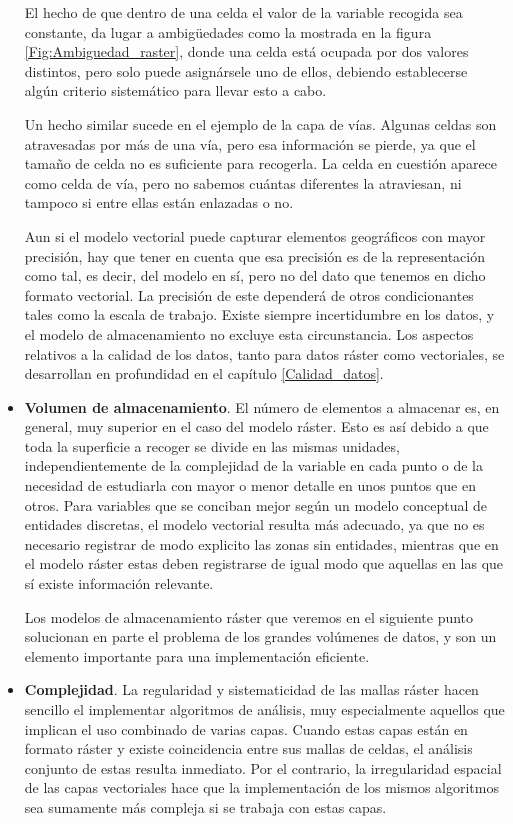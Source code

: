 \begin{multicols}{2}
\begin{itemize}
El hecho de que dentro de una celda el valor de la variable recogida sea constante, da lugar a ambigüedades como la mostrada en la figura \ref{Fig:Ambiguedad_raster}, donde una celda está ocupada por dos valores distintos, pero solo puede asignársele uno de ellos, debiendo establecerse algún criterio sistemático para llevar esto a cabo.

Un hecho similar sucede en el ejemplo de la capa de vías. Algunas celdas son atravesadas por más de una vía, pero esa información se pierde, ya que el tamaño de celda no es suficiente para recogerla. La celda en cuestión aparece como celda de vía, pero no sabemos cuántas diferentes la atraviesan, ni tampoco si entre ellas están enlazadas o no.

Aun si el modelo vectorial puede capturar elementos geográficos con mayor precisión, hay que tener en cuenta que esa precisión es de la representación como tal, es decir, del modelo en sí, pero no del dato que tenemos en dicho formato vectorial. La precisión de este dependerá de otros condicionantes tales como la escala de trabajo. Existe siempre incertidumbre en los datos, y el modelo de almacenamiento no excluye esta circunstancia. Los aspectos relativos a la calidad de los datos, tanto para datos ráster como vectoriales, se desarrollan en profundidad en el capítulo \ref{Calidad_datos}.

\item \textbf{Volumen de almacenamiento}. El número de elementos a almacenar es, en general, muy superior en el caso del modelo ráster. Esto es así debido a que toda la superficie a recoger se divide en las mismas unidades, independientemente de la complejidad de la variable en cada punto o de la necesidad de estudiarla con mayor o menor detalle en unos puntos que en otros. Para variables que se conciban mejor según un modelo conceptual de entidades discretas, el modelo vectorial resulta más adecuado, ya que no es necesario registrar de modo explicito las zonas sin entidades, mientras que en el modelo ráster estas deben registrarse de igual modo que aquellas en las que sí existe información relevante.

Los modelos de almacenamiento ráster que veremos en el siguiente punto solucionan en parte el problema de los grandes volúmenes de datos, y son un elemento importante para una implementación eficiente.

\item \textbf{Complejidad}. La regularidad y sistematicidad de las mallas ráster hacen sencillo el implementar algoritmos de análisis, muy especialmente aquellos que implican el uso combinado de varias capas. Cuando estas capas están en formato ráster y existe coincidencia entre sus mallas de celdas, el análisis conjunto de estas resulta inmediato. Por el contrario, la irregularidad espacial de las capas vectoriales hace que la implementación de los mismos algoritmos sea sumamente más compleja si se trabaja con estas capas.


\end{itemize}
\end{multicols}
